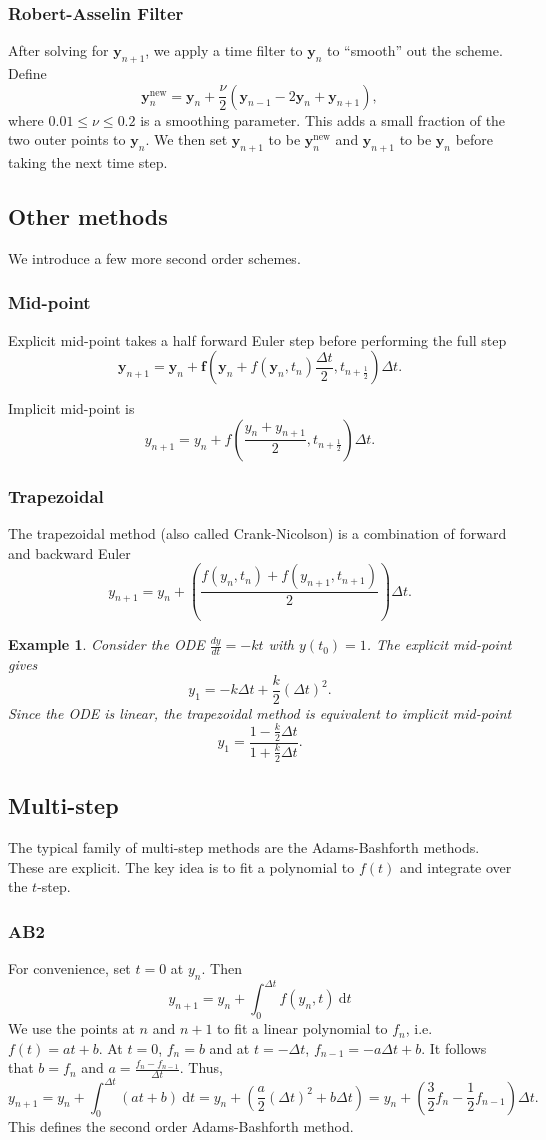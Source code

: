 \documentclass[11pt, a4paper]{article}
\theoremstyle{break}
\newtheorem{eg}[thm]{Example}
\newcommand*{\Paren}[1]{\left(#1\right)}%
\newcommand{\ve}{\mathbf} %
\newcommand{\dt}{\Delta t}
\newcommand{\dder}[2]{\frac{d #1}{d #2}}
\newcommand{\dd}{\ \mathrm{d}}
\begin{document}
\subsubsection{Robert-Asselin Filter}
After solving for $\ve y_{n+1}$, we apply a time filter to $\ve y_n$ to ``smooth'' out the scheme. Define \[\ve y_n^{\text{new}}=\ve y_n+\frac\nu2(\ve y_{n-1}-2\ve y_n+\ve y_{n+1}),\] where $0.01\leq \nu\leq 0.2$ is a smoothing parameter. This adds a small fraction of the two outer points to $\ve y_n$. We then set $\ve y_{n+1}$ to be $\ve y_n^\text{new}$ and $\ve y_{n+1}$ to be $\ve y_n$ before taking the next time step.

\subsection{Other methods}
We introduce a few more second order schemes.
\subsubsection{Mid-point}
Explicit mid-point takes a half forward Euler step before performing the full step
\[\ve y_{n+1}=\ve y_n + \ve f\Paren{\ve y_n+f(\ve y_n,t_n)\frac{\dt}2,t_{n+\frac12}}\dt.\]

Implicit mid-point is \[y_{n+1}	=y_n+f\Paren{\frac{y_n+y_{n+1}}{2},t_{n+\frac12}}\dt.\]
\subsubsection{Trapezoidal}
The trapezoidal method (also called Crank-Nicolson) is a combination of forward and backward Euler \[y_{n+1}=y_n+\Paren{\frac{f(y_n,t_n)+f(y_{n+1},t_{n+1})}{2}}\dt.\]

\begin{eg}
Consider the ODE $\dder yt=-kt$ with $y(t_0)=1$. The explicit mid-point gives \[y_1=-k\dt+\frac{k}{2}(\dt)^2.\] Since the ODE is linear, the trapezoidal method is equivalent to implicit mid-point \[y_1=\frac{1-\frac k2\dt}{1+\frac k2\dt}.\]
\end{eg}

\subsection{Multi-step}
The typical family of multi-step methods are the Adams-Bashforth methods. These are explicit. The key idea is to fit a polynomial to $f(t)$ and integrate over the $t$-step.
\subsubsection{AB2}
For convenience, set $t=0$ at $y_n$. Then \[y_{n+1}=y_n+\int_0^{\dt} f(y_n,t)\dd t\]
 We use the points at $n$ and $n+1$ to fit a linear polynomial to $f_n$, i.e. $f(t)=at+b$. At $t=0$, $f_n=b$ and at $t=-\dt$, $f_{n-1}=-a\dt+b$. It follows that $b=f_n$ and $a=\frac{f_n-f_{n-1}}{\dt}$. Thus, \[y_{n+1}=y_n+\int_0^{\dt}(at+b)\dd t=y_n+\Paren{\frac{a}2(\dt)^2+b\dt}=y_n+\Paren{\frac32f_n-\frac12f_{n-1}}\dt.\]
 This defines the second order Adams-Bashforth method.
\end{document}
